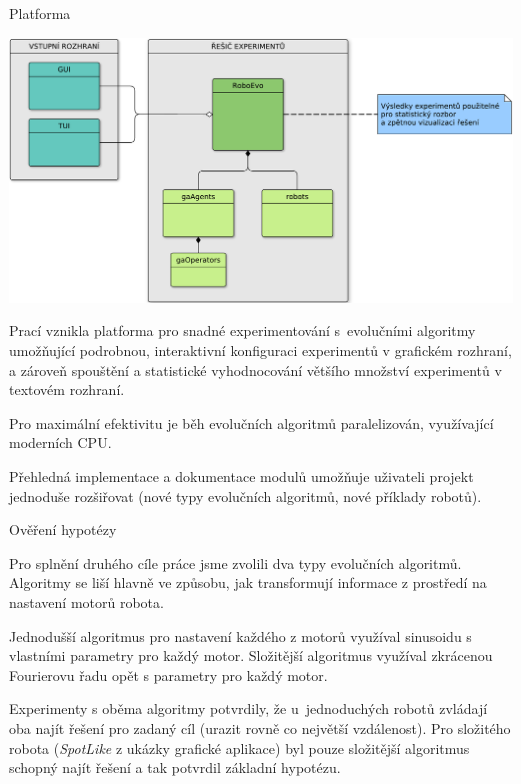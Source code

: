 \documentclass[portrait,a0paper,fontscale=0.25]{baposter}
\begin{document}
\begin{poster}
\begin{posterbox}[column=1, name=result1]{Platforma}
\begin{center}
\vspace{5px}
\includegraphics[width=0.9\linewidth]{../../BP/img/BP_imp_graph.pdf}
\end{center}

Prací vznikla platforma pro snadné experimentování s~evolučními algoritmy
umožňující podrobnou, interaktivní konfiguraci experimentů v grafickém
rozhraní, a zároveň spouštění a statistické vyhodnocování většího množství
experimentů v textovém rozhraní. 

Pro maximální efektivitu je běh evolučních algoritmů paralelizován, využívající
moderních CPU.

Přehledná implementace a dokumentace modulů umožňuje uživateli projekt
jednoduše rozšiřovat (nové typy evolučních algoritmů, nové příklady robotů).

\end{posterbox}

\begin{posterbox}[column=1, name=result2, below=result1]{Ověření hypotézy}

Pro splnění druhého cíle práce jsme zvolili dva typy evolučních algoritmů.
Algoritmy se liší hlavně ve způsobu, jak transformují informace z prostředí na
nastavení motorů robota. 

Jednodušší algoritmus pro nastavení každého z motorů využíval sinusoidu s
vlastními parametry pro každý motor. Složitější algoritmus využíval zkrácenou
Fourierovu řadu opět s parametry pro každý motor.

Experimenty s oběma algoritmy potvrdily, že u~jednoduchých robotů zvládají oba
najít řešení pro zadaný cíl (urazit rovně co největší vzdálenost). Pro
složitého robota (\emph{SpotLike} z ukázky grafické aplikace) byl pouze
složitější algoritmus schopný najít řešení a tak potvrdil základní hypotézu.


\end{posterbox}
\end{poster}
\end{document}
